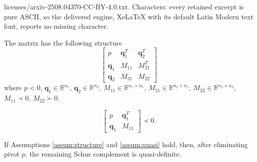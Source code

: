 \documentclass[10pt,a4paper]{amsart}
\newcommand{\qvec}{\mathbf q}
\begin{document}
licenses/arxiv-2508.04370-CC-BY-4.0.txt. Characters: every retained excerpt is pure ASCII, so the delivered engine, XeLaTeX with its default Latin Modern text font, reports no missing character.
\begin{assumption}
\label{assum:structure}
The matrix has the following structure
\[
\begin{bmatrix}
p & \qvec_1^T & \qvec_2^T \\
\qvec_1 & M_{11} & M_{21}^T \\
\qvec_2 & M_{21} & M_{22}
\end{bmatrix}
\]
where $p<0$, $\qvec_1\in\mathbb R^{n_1}$, $\qvec_2\in\mathbb R^{n_2}$, $M_{11}\in\mathbb R^{n_1\times n_1}$, $M_{21}\in\mathbb R^{n_2\times n_1}$, $M_{22}\in\mathbb R^{n_2\times n_2}$, $M_{11}\prec 0$, $M_{22}\succ0$.
\end{assumption}

\begin{assumption}
\label{assum:quasi}
\[\begin{bmatrix}
p & \qvec_1^T \\ \qvec_1 & M_{11}
\end{bmatrix}\prec0.
\]
\end{assumption}

\begin{proposition}
If Assumptions \ref{assum:structure} and \ref{assum:quasi} hold, then, after eliminating pivot $p$, the remaining Schur complement is quasi-definite.
\end{proposition}
\end{document}
